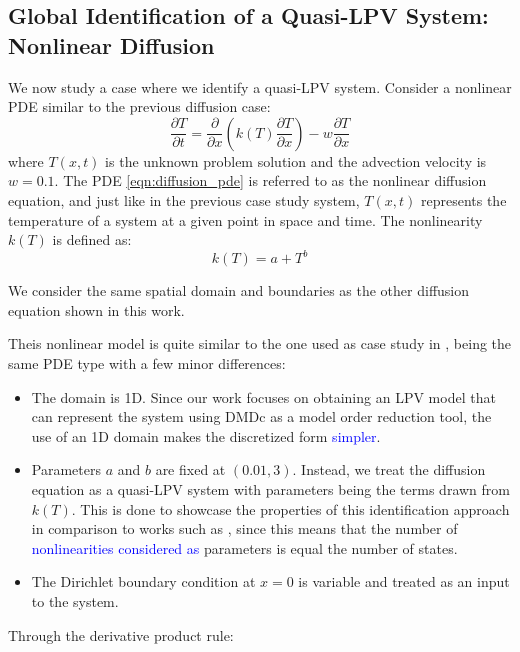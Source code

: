 \subsection{Global Identification of a Quasi-LPV System: Nonlinear Diffusion}

We now study a case where we identify a quasi-LPV system.
%
Consider a nonlinear PDE similar to the previous diffusion case:
\begin{equation} \label{eqn:diffusion_pde}
  \frac{\partial T}{\partial t} = \frac{\partial }{\partial x}\left(k(T) \frac{\partial T}{\partial x}\right) - w\frac{\partial T}{\partial x} 
\end{equation}
where $T(x,t)$ is the unknown problem solution and the advection
velocity is $w = 0.1$.
%
The PDE \eqref{eqn:diffusion_pde} is referred to as the nonlinear diffusion equation, and just like in the previous case study system, $T(x,t)$ represents the temperature of a system at a given point in space and time.
%
The nonlinearity $k(T)$ is defined as:
\begin{equation}
    k(T) = a + T^b
\end{equation}

We consider the same spatial domain and boundaries as the other diffusion equation shown in this work.
  
{%
Theis nonlinear model is quite similar to the one used as case study in \cite{Huhn2023}, being the same PDE type with a few minor differences:
\begin{itemize}
    \item The domain is 1D.
    Since our work focuses on obtaining an LPV model that can represent the system using DMDc as a model order reduction tool, the use of an 1D domain makes the discretized form \textcolor{blue}{simpler}.
    
    \item Parameters $a$ and $b$ are fixed at $(0.01,3)$. Instead, we treat the diffusion equation as a quasi-LPV system with parameters being the terms drawn from $k(T)$. This is done to showcase the properties of this identification approach in comparison to works such as \cite{Huhn2023}, since this means that the number of \textcolor{blue}{nonlinearities considered as} parameters is equal the number of states.
    \item The Dirichlet boundary condition at $x = 0$ is variable and treated as an input to the system.
\end{itemize}
}
\color{blue}
Through the derivative product rule:

